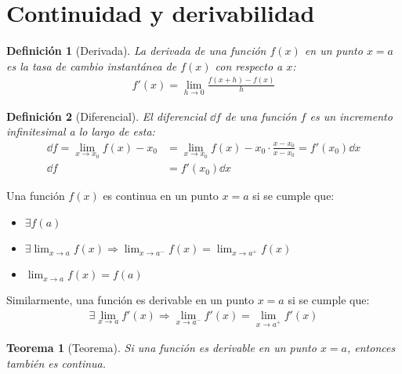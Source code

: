 \documentclass{article}
\newtheorem{deriv}{Definición}
\newtheorem{derivableLuegoContinua}{Teorema}
\begin{document}
\section{Continuidad y derivabilidad}
\begin{deriv}[Derivada]
    La derivada de una función $f(x)$ en un punto $x=a$ es la tasa de cambio
    instantánea de $f(x)$ con respecto a $x$:
    \begin{equation}
        \begin{split}
            f'(x)= \lim_{h \to 0} \frac{f(x+h)-f(x)}{h}
        \end{split}
    \end{equation}
\end{deriv}
\begin{deriv}[Diferencial]
    El diferencial $ \dd{f}$ de una función $f$ es un incremento infinitesimal a lo largo de esta:
    \begin{equation}
        \begin{split}
            \dd{f} = \lim_{x \to x_{0}}f(x)-x_{0}&=\lim_{x \to x_{0}}f(x)-x_{0}\cdot \frac{x-x_{0}}{x-x_{0}}
            =f'(x_{0}) \dd{x}\\
            \dd{f} &= f'(x_{0}) \dd{x}
        \end{split}
    \end{equation}
\end{deriv}
Una función $f(x)$ es continua en un punto $x=a$ si se cumple que:
\begin{itemize}
    \item $\exists f(a)$
    \item $\exists \lim_{x \to a} f(x) \Rightarrow \lim_{x \to a^-} f(x)= \lim_{x \to a^+} f(x)$
    \item $\lim_{x \to a}f(x)=f(a)$  
\end{itemize}
Similarmente, una función es derivable en un punto $x=a$ si se cumple que:
\begin{equation}
    \begin{split}
        \exists \lim_{x \to a} f'(x) \Rightarrow \lim_{x \to a^-} f'(x)= \lim_{x \to a^+} f'(x)
    \end{split}
\end{equation}
\begin{derivableLuegoContinua}[Teorema]
    Si una función es derivable en un punto $x=a$, entonces también es continua.
\end{derivableLuegoContinua}
\end{document}
